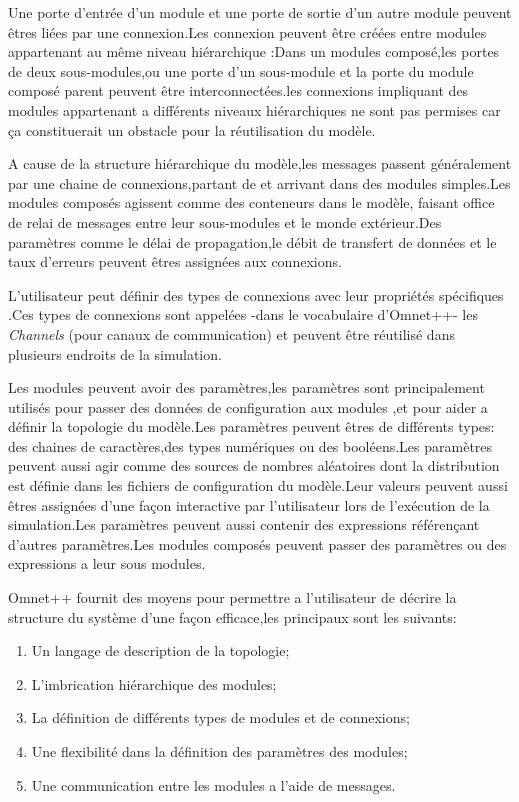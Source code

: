 Une porte d'entrée d'un module et une porte de sortie d'un autre module peuvent êtres liées par une connexion.Les connexion peuvent être créées entre modules appartenant au même niveau hiérarchique :Dans un modules composé,les portes de deux sous-modules,ou une porte d'un sous-module et la porte du module composé parent peuvent être interconnectées.les connexions impliquant des modules appartenant a différents niveaux hiérarchiques ne sont pas permises car ça constituerait un obstacle pour la réutilisation du modèle.

A cause de la structure hiérarchique du modèle,les messages passent généralement par une chaine de connexions,partant de et arrivant dans des modules simples.Les modules composés agissent comme des conteneurs dans le modèle, faisant office de relai de messages entre leur sous-modules et le monde extérieur.Des paramètres comme le délai de propagation,le débit de transfert de données et le taux d'erreurs peuvent êtres assignées aux connexions.

L'utilisateur peut définir des types de connexions avec leur propriétés spécifiques .Ces types de connexions sont appelées -dans le vocabulaire d'Omnet++- les \emph{Channels} (pour canaux de communication)  et peuvent être réutilisé dans plusieurs endroits de la simulation.

Les modules peuvent avoir des paramètres,les paramètres sont principalement utilisés pour passer des données de configuration aux modules ,et pour aider a définir la topologie du modèle.Les paramètres peuvent êtres  de différents types: des chaines de caractères,des types numériques ou des booléens.Les paramètres peuvent aussi agir comme des sources de nombres aléatoires dont la distribution est définie dans les fichiers de configuration du modèle.Leur valeurs peuvent aussi êtres assignées d'une façon interactive par l'utilisateur lors de l'exécution de la simulation.Les paramètres peuvent aussi contenir des expressions référençant d'autres paramètres.Les modules composés peuvent passer des paramètres ou des expressions a leur sous modules.

Omnet++ fournit des moyens  pour permettre a l'utilisateur de décrire  la structure du système d'une façon efficace,les principaux sont les suivants:

\begin{enumerate}
\item Un langage de description de la topologie;
\item L'imbrication hiérarchique des modules;
\item La définition de différents types de modules et de connexions;
\item Une flexibilité dans la définition des paramètres des modules;
\item Une communication entre les modules a l'aide de messages.
\end{enumerate}

